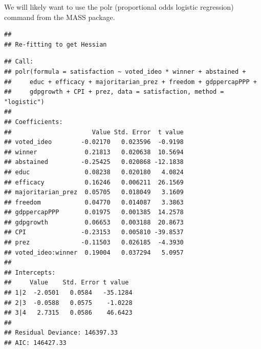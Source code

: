 \documentclass[]{book}
\newenvironment{Shaded}{\begin{snugshade}}{\end{snugshade}}
\newcommand{\KeywordTok}[1]{\textcolor[rgb]{0.13,0.29,0.53}{\textbf{#1}}}
\newcommand{\DataTypeTok}[1]{\textcolor[rgb]{0.13,0.29,0.53}{#1}}
\newcommand{\StringTok}[1]{\textcolor[rgb]{0.31,0.60,0.02}{#1}}
\newcommand{\OperatorTok}[1]{\textcolor[rgb]{0.81,0.36,0.00}{\textbf{#1}}}
\newcommand{\NormalTok}[1]{#1}
\begin{document}
We will likely want to use the polr (proportional odds logistic
regression) command from the MASS package.

\begin{Shaded}
\end{Shaded}

\begin{verbatim}
## 
## Re-fitting to get Hessian
\end{verbatim}

\begin{verbatim}
## Call:
## polr(formula = satisfaction ~ voted_ideo * winner + abstained + 
##     educ + efficacy + majoritarian_prez + freedom + gdppercapPPP + 
##     gdpgrowth + CPI + prez, data = satisfaction, method = "logistic")
## 
## Coefficients:
##                      Value Std. Error  t value
## voted_ideo        -0.02170   0.023596  -0.9198
## winner             0.21813   0.020638  10.5694
## abstained         -0.25425   0.020868 -12.1838
## educ               0.08238   0.020180   4.0824
## efficacy           0.16246   0.006211  26.1569
## majoritarian_prez  0.05705   0.018049   3.1609
## freedom            0.04770   0.014087   3.3863
## gdppercapPPP       0.01975   0.001385  14.2578
## gdpgrowth          0.06653   0.003188  20.8673
## CPI               -0.23153   0.005810 -39.8537
## prez              -0.11503   0.026185  -4.3930
## voted_ideo:winner  0.19004   0.037294   5.0957
## 
## Intercepts:
##     Value    Std. Error t value 
## 1|2  -2.0501   0.0584   -35.1284
## 2|3  -0.0588   0.0575    -1.0228
## 3|4   2.7315   0.0586    46.6423
## 
## Residual Deviance: 146397.33 
## AIC: 146427.33
\end{verbatim}
\end{document}
